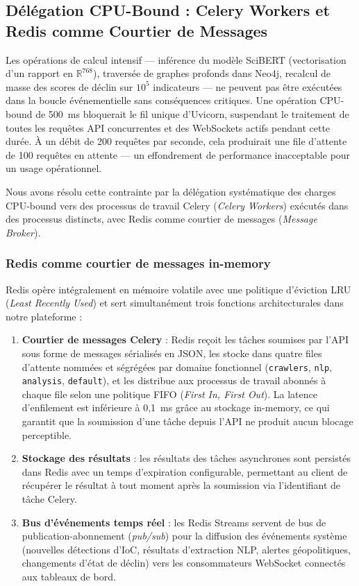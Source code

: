 \subsection{Délégation CPU-Bound : Celery Workers et Redis comme Courtier de Messages}

Les opérations de calcul intensif --- inférence du modèle SciBERT (vectorisation d'un rapport en $\mathbb{R}^{768}$), traversée de graphes profonds dans Neo4j, recalcul de masse des scores de déclin sur $10^5$ indicateurs --- ne peuvent pas être exécutées dans la boucle événementielle sans conséquences critiques. Une opération CPU-bound de 500~ms bloquerait le fil unique d'Uvicorn, suspendant le traitement de toutes les requêtes API concurrentes et des WebSockets actifs pendant cette durée. À un débit de 200 requêtes par seconde, cela produirait une file d'attente de 100 requêtes en attente --- un effondrement de performance inacceptable pour un usage opérationnel.

Nous avons résolu cette contrainte par la délégation systématique des charges CPU-bound vers des processus de travail Celery (\textit{Celery Workers}) exécutés dans des processus distincts, avec Redis comme courtier de messages (\textit{Message Broker}).

\subsubsection{Redis comme courtier de messages in-memory}

Redis opère intégralement en mémoire volatile avec une politique d'éviction LRU (\textit{Least Recently Used}) et sert simultanément trois fonctions architecturales dans notre plateforme :

\begin{enumerate}
    \item \textbf{Courtier de messages Celery} : Redis reçoit les tâches soumises par l'API sous forme de messages sérialisés en JSON, les stocke dans quatre files d'attente nommées et ségrégées par domaine fonctionnel (\texttt{crawlers}, \texttt{nlp}, \texttt{analysis}, \texttt{default}), et les distribue aux processus de travail abonnés à chaque file selon une politique FIFO (\textit{First In, First Out}). La latence d'enfilement est inférieure à 0{,}1~ms grâce au stockage in-memory, ce qui garantit que la soumission d'une tâche depuis l'API ne produit aucun blocage perceptible.
    \item \textbf{Stockage des résultats} : les résultats des tâches asynchrones sont persistés dans Redis avec un temps d'expiration configurable, permettant au client de récupérer le résultat à tout moment après la soumission via l'identifiant de tâche Celery.
    \item \textbf{Bus d'événements temps réel} : les Redis Streams servent de bus de publication-abonnement (\textit{pub/sub}) pour la diffusion des événements système (nouvelles détections d'IoC, résultats d'extraction NLP, alertes géopolitiques, changements d'état de déclin) vers les consommateurs WebSocket connectés aux tableaux de bord.
\end{enumerate}

